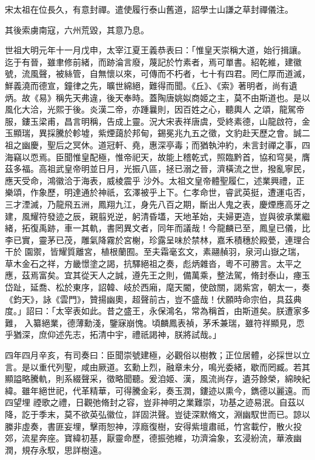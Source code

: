 \begin{pinyinscope}
 宋太祖在位長久，有意封禪。遣使履行泰山舊道，詔學士山謙之草封禪儀注。



 其後索虜南寇，六州荒毀，其意乃息。



 世祖大明元年十一月戊申，太宰江夏王義恭表曰：「惟皇天崇稱大道，始行揖讓。迄于有晉，雖聿修前緒，而跡淪言廢，蔑記於竹素者，焉可單書。紹乾維，建徽號，流風聲，被絲管，自無懷以來，可傳而不朽者，七十有四君。罔仁厚而道滅，鮮義澆而德宣，鐘律之先，曠世綿絕，難得而聞。《丘》、《索》著明者，尚有遺炳。故《易》稱先天弗違，後天奉時。蓋陶唐姚姒商姬之主，莫不由斯道也。是以風化大洽，光熙于後。炎漢二帝，亦踵曩則，因百姓之心，聽輿人
 之頌，龍駕帝服，鏤玉梁甫，昌言明稱，告成上靈。況大宋表祥唐虞，受終素德，山龍啟符，金玉顯瑞，異採騰於軫墟，紫煙藹於邦甸，錫冕兆九五之徵，文豹赴天歷之會。誠二祖之幽慶，聖后之冥休。道冠軒、堯，惠深亭毒；而猶執沖約，未言封禪之事，四海竊以恧焉。臣聞惟皇配極，惟帝祀天，故能上稽乾式，照臨黔首，協和穹昊，膺茲多福。高祖武皇帝明並日月，光振八區，拯已溺之晉，濟橫流之世，撥亂寧民，應天受命，鴻徽洽于海表，威棱震乎
 沙外。太祖文皇帝體聖履仁，述業興禮，正樂頌，作象歷，明達通於神祇，玄澤被乎上下。仁孝命世，睿武英挺，遭運屯否，三才湮滅，乃龍飛五洲，鳳翔九江，身先八百之期，斷出人鬼之表，慶煙應高牙之建，風耀符發迹之辰，親翦兇逆，躬清昏壒，天地革始，夫婦更造，豈與彼承業繼緒，拓復禹跡，車一其軌，書罔異文者，同年而議哉！今龍麟已至，鳳皇已儀，比李已實，靈茅已茂，雕氣降霧於宮榭，珍露呈味於禁林，嘉禾積穗於殿甍，連理合干於
 園禦，皆耀質離宮，植根蘭囿。至夫霜毫玄文，素翮赬羽，泉河山嶽之瑞，草木金石之祥，方畿憬塗之謁，抗驛絕祖之奏，彪炳雜沓，粵不可勝言。太平之應，茲焉富矣。宜其從天人之誠，遵先王之則，備萬乘，整法駕，脩封泰山，瘞玉岱趾，延喬、松於東序，詔韓、岐於西廂，麾天閽，使啟關，謁紫宮，朝太一，奏《鈞天》，詠《雲門》，贊揚幽奧，超聲前古，豈不盛哉！伏願時命宗伯，具茲典度。」詔曰：「太宰表如此。昔之盛王，永保鴻名，常為稱首，由斯道矣。朕遭家多難，
 入纂絕業，德薄勳淺，鑒寐崩愧。頃麟鳳表禎，茅禾兼瑞，雖符祥顯見，恧乎猶深，庶仰述先志，拓清中宇，禮祇謁神，朕將試哉。」



 四年四月辛亥，有司奏曰：臣聞崇號建極，必觀俗以樹教；正位居體，必採世以立言。是以重代列聖，咸由厥道。玄勳上烈，融章未分，鳴光委緒，歇而罔臧。若其顯謚略騰軌，則系綴聲采，徵略聞聽。爰洎姬、漢，風流尚存，遺芬餘榮，綿映紀緯。雖年絕世祀，代革精華，可得騰金彩，奏玉潤，鏤迹以熏今，鐫德以麗遠。而四望埋
 禋歌之禮，日觀弛脩封之容，豈非神明之業難崇，功基之迹易泯。自茲以降，訖于季末，莫不欲英弘徽位，詳固洪聲。豈徒深默脩文，淵幽馭世而已。諒以縢非虛奏，書匪妄埋，擊雨恕神，淳廕復樹，安得紫壇肅祗，竹宮載佇，散火投郊，流星奔座。寶緯初基，厭靈命歷，德振弛維，功濟淪象，玄浸紛流，華液幽潤，規存永馭，思詳樹遠。




\end{pinyinscope}
